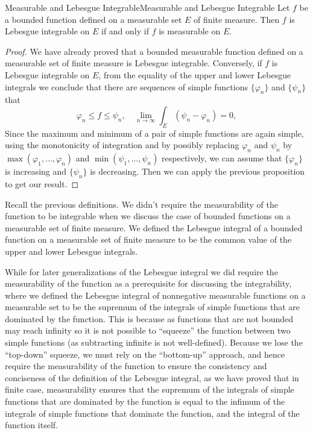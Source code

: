 \documentclass[../main.tex]{subfiles}
\begin{document}
\begin{theorem}{Measurable and Lebesgue Integrable}{Measurable and Lebesgue Integrable}
	Let $f$ be a bounded function defined on a measurable set $E$ of finite measure. Then $f$ is Lebesgue integrable on $E$ if and only if $f$ is measurable on $E$.
\end{theorem}
\begin{proof}
	We have already proved that a bounded measurable function defined on a measurable set of finite measure is Lebesgue integrable. Conversely, if $f$ is Lebesgue integrable on $E$, from the equality of the upper and lower Lebesgue integrals we conclude that there are sequences of simple functions $\{ \varphi_n \}$ and $\{ \psi_n \}$ that
	\begin{equation*}
		\varphi_n \leq f \leq \psi_n, \quad \lim_{n \to \infty} \int_E (\psi_n - \varphi_n) = 0,
	\end{equation*}
	Since the maximum and minimum of a pair of simple functions are again simple, using the monotonicity of integration and by possibly replacing $\varphi_n$ and $\psi_n$ by $\max(\varphi_1, \ldots, \varphi_n)$ and $\min(\psi_1, \ldots, \psi_n)$ respectively, we can assume that $\{\varphi_n\}$ is increasing and $\{\psi_n\}$ is decreasing. Then we can apply the previous proposition to get our result.
\end{proof}

\begin{remark}
	Recall the previous definitions. We didn't require the measurability of the function to be integrable when we discuss the case of bounded functions on a measurable set of finite measure. We defined the Lebesgue integral of a bounded function on a measurable set of finite measure to be the common value of the upper and lower Lebesgue integrals.

	While for later generalizations of the Lebesgue integral we did require the measurability of the function as a prerequisite for discussing the integrability, where we defined the Lebesgue integral of nonnegative measurable functions on a measurable set to be the supremum of the integrals of simple functions that are dominated by the function. This is because as functions that are not bounded may reach infinity so it is not possible to ``squeeze'' the function between two simple functions (as subtracting infinite is not well-defined). Because we lose the ``top-down'' squeeze, we must rely on the ``bottom-up'' approach, and hence require the measurability of the function to ensure the consistency and conciseness of the definition of the Lebesgue integral, as we have proved that in finite case, measurability ensures that the supremum of the integrals of simple functions that are dominated by the function is equal to the infimum of the integrals of simple functions that dominate the function, and the integral of the function itself.
\end{remark}
\end{document}
